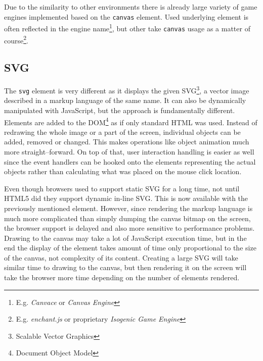 \documentclass[11pt,oneside, final]{fithesis2}
\begin{document}
Due to the similarity to other environments there is already large variety of game engines implemented based on the \texttt{canvas} element. Used underlying element is often reflected in the engine name\footnote{E.g. \emph{Canvace}\cite{canvace} or \emph{Canvas Engine}\cite{canvasengine}}, but other take \texttt{canvas} usage as a matter of course\footnote{E.g. \emph{enchant.js}\cite{enchantjs} or proprietary \emph{Isogenic Game Engine}\cite{isogenic}}.

\subsection{SVG}
The \texttt{svg} element is very different as it displays the given SVG\footnote{Scalable Vector Graphics}, a vector image described in a markup language of the same name. It can also be dynamically manipulated with JavaScript, but the approach is fundamentally different. Elements are added to the DOM\footnote{Document Object Model} as if only standard HTML was used. Instead of redrawing the whole image or a part of the screen, individual objects can be added, removed or changed. This makes operations like object animation much more straight--forward. On top of that, user interaction handling is easier as well since the event handlers can be hooked onto the elements representing the actual objects rather than calculating what was placed on the mouse click location.

Even though browsers used to support static SVG for a long time, not until HTML5 did they support dynamic in-line SVG\cite{w3_html5}. This is now available with the previously mentioned element. However, since rendering the markup language is much more complicated than simply dumping the canvas bitmap on the screen, the browser support is delayed and also more sensitive to performance problems. Drawing to the canvas may take a lot of JavaScript execution time, but in the end the display of the element takes amount of time only proportional to the size of the canvas, not complexity of its content. Creating a large SVG will take similar time to drawing to the canvas, but then rendering it on the screen will take the browser more time depending on the number of elements rendered.
\end{document}
